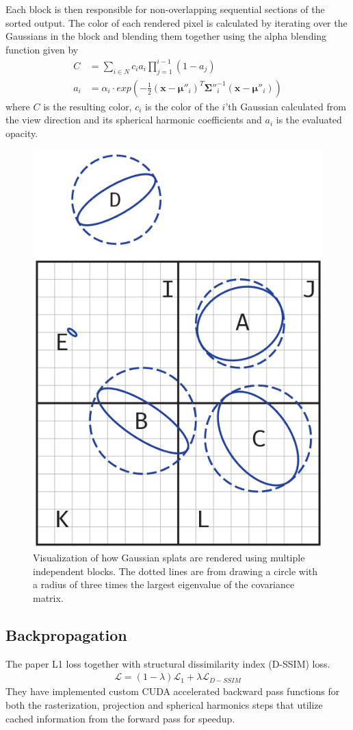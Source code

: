 Each block is then responsible for non-overlapping sequential sections of the sorted output.
The color of each rendered pixel is calculated by iterating over the Gaussians in the block and blending them together using the alpha blending function given by
\begin{align}
    C   & = \sum_{i \in N} c_i a_i \prod_{j=1}^{i-1} (1-a_j)                                                     \\
    a_i & = \alpha_i \cdot exp(-\frac{1}{2}(\bm{x}-\bm{\mu}''_i)^T \bm{\Sigma}{''}_i^{-1} (\bm{x}-\bm{\mu}''_i))
    \label{eq:alpha_blending}
\end{align}
where $C$ is the resulting color, $c_i$ is the color of the $i$'th Gaussian calculated from the view direction and its spherical harmonic coefficients and $a_i$ is the evaluated opacity.

\begin{figure}
    \centering
    \includegraphics[width=0.6\linewidth]{images/rendering.png}
    \caption{Visualization of how Gaussian splats are rendered using multiple independent blocks. The dotted lines are from drawing a circle with a radius of three times the largest eigenvalue of the covariance matrix.}
    \label{fig:rendering}
\end{figure}


\subsection{Backpropagation}
The paper L1 loss together with structural dissimilarity index (D-SSIM) loss.
\begin{align}
    \mathcal{L} = (1 - \lambda) \mathcal{L}_1 + \lambda \mathcal{L}_{D-SSIM}
\end{align}
They have implemented custom CUDA accelerated backward pass functions for both the rasterization, projection and spherical harmonics steps that utilize cached information from the forward pass for speedup.




